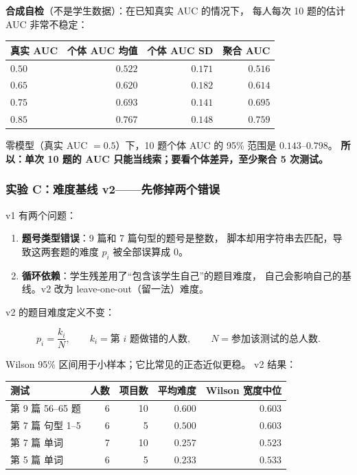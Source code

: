\documentclass[UTF8,a4paper,11pt]{ctexart}
\begin{document}
\textbf{合成自检}（不是学生数据）：在已知真实 AUC 的情况下，
每人每次 10 题的估计 AUC 非常不稳定：

\begin{center}
\begin{longtable}{@{}lrrr@{}}
\toprule
\textbf{真实 AUC} & \textbf{个体 AUC 均值} & \textbf{个体 AUC SD} & \textbf{聚合 AUC} \\
\midrule
$0.50$ & $0.522$ & $0.171$ & $0.516$ \\
$0.65$ & $0.620$ & $0.182$ & $0.614$ \\
$0.75$ & $0.693$ & $0.141$ & $0.695$ \\
$0.85$ & $0.767$ & $0.148$ & $0.759$ \\
\bottomrule
\end{longtable}
\end{center}

零模型（真实 AUC $=0.5$）下，10 题个体 AUC 的 95\% 范围是 $0.143$--$0.798$。
\textbf{所以：单次 10 题的 AUC 只能当线索；要看个体差异，至少聚合 5 次测试。}

\subsubsection{实验 C：难度基线 v2——先修掉两个错误}

v1 有两个问题：
\begin{enumerate}[leftmargin=2em]
\item \textbf{题号类型错误}：9 篇和 7 篇句型的题号是整数，
脚本却用字符串去匹配，导致这两套题的难度 $p_i$ 被全部误算成 $0$。
\item \textbf{循环依赖}：学生残差用了“包含该学生自己”的题目难度，
自己会影响自己的基线。v2 改为 leave-one-out（留一法）难度。
\end{enumerate}

v2 的题目难度定义不变：

\begin{equation}
p_i=\frac{k_i}{N},\qquad
k_i=\text{第 }i\text{ 题做错的人数},\qquad
N=\text{参加该测试的总人数}.
\end{equation}

Wilson 95\% 区间用于小样本；它比常见的正态近似更稳。
v2 结果：

\begin{center}
\begin{longtable}{@{}lrrrr@{}}
\toprule
\textbf{测试} & \textbf{人数} & \textbf{项目数} & \textbf{平均难度} & \textbf{Wilson 宽度中位} \\
\midrule
第 9 篇 56--65 题 & 6 & 10 & $0.600$ & $0.603$ \\
第 7 篇 句型 1--5 & 6 & 5 & $0.500$ & $0.603$ \\
第 7 篇 单词 & 7 & 10 & $0.257$ & $0.523$ \\
第 5 篇 单词 & 6 & 5 & $0.233$ & $0.533$ \\
\bottomrule
\end{longtable}
\end{center}
\end{document}
